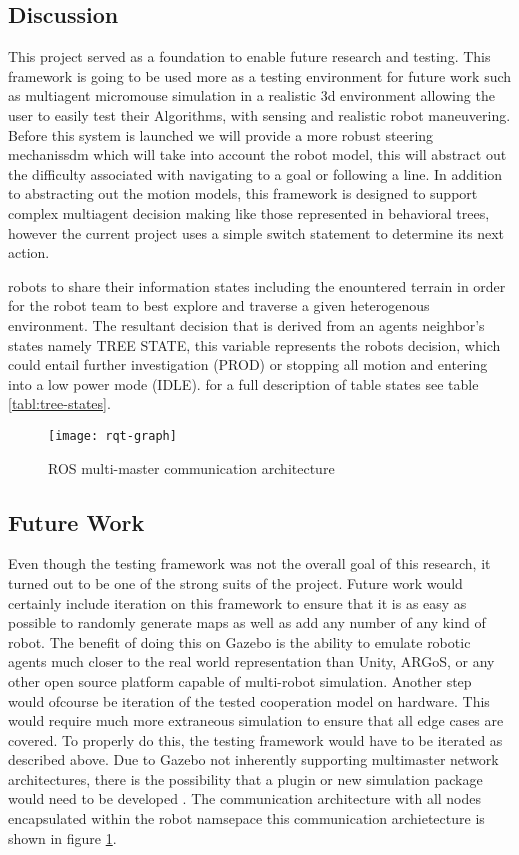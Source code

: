 \subsection{Discussion}
This project served as a foundation to enable future research and testing.
This framework is going to be used more as a testing environment for future work such
as multiagent micromouse simulation in a realistic 3d environment allowing the user to easily test
their Algorithms, with sensing and realistic robot maneuvering. Before this system is launched
we will provide a more robust steering mechanissdm which will take into account the robot model,
this will abstract out the difficulty associated with navigating to a goal or following a line.
In addition to abstracting out the motion models, this framework is designed to support complex
multiagent decision making like those represented in behavioral trees, however the current project uses a simple switch statement to determine its next action.

robots to share their information states including the enountered
terrain in order for the robot team to best explore and traverse a
given heterogenous environment. The resultant decision that is derived
from an agents neighbor's states namely TREE STATE, this variable
represents the robots decision, which could entail further investigation
(PROD) or stopping all motion and entering into a low power mode (IDLE).
for a full description of table states see table \ref{tabl:tree-states}.


\begin{figure}[H]
  \centering
    \texttt{[image: rqt-graph]}
  \caption{ROS multi-master communication architecture}
  \label{fig:comm}
\end{figure}

\subsection{Future Work}
Even though the testing framework was not the overall goal of this research,
it turned out to be one of the strong suits of the project. Future work would certainly
include iteration on this framework to ensure that it is as easy as possible to
randomly generate maps as well as add any number of any kind of robot. The benefit
of doing this on Gazebo is the ability to emulate robotic agents much closer to the
real world representation than Unity, ARGoS, or any other open source platform
capable of multi-robot simulation. Another step would ofcourse be iteration of the tested cooperation model on hardware.
This would require much more extraneous simulation to ensure that all edge cases are
covered. To properly do this, the testing framework would have to be iterated as
described above. Due to Gazebo not inherently supporting multimaster network architectures,
there is the possibility that a plugin or new simulation package would need to be
developed \cite{ROS-mm}. The communication architecture with all nodes encapsulated within the robot namsepace
this communication archietecture is shown in figure \ref{fig:comm}.
